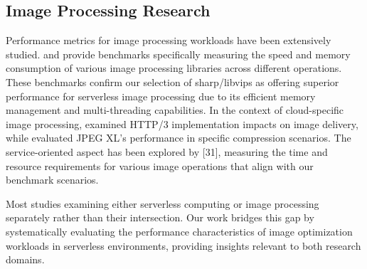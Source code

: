 \subsection{Image Processing Research}
\enlargethispage{10\baselineskip}

Performance metrics for image processing workloads have been extensively studied. \cite{fuller2024sharp} and \cite{cupitt2024libvips-speed} provide benchmarks specifically measuring the speed and memory consumption of various image processing libraries across different operations. These benchmarks confirm our selection of sharp/libvips as offering superior performance for serverless image processing due to its efficient memory management and multi-threading capabilities. In the context of cloud-specific image processing, \cite{bishop2022rfc-http3} examined HTTP/3 implementation impacts on image delivery, while \cite{sneyers2024jxl-modular} evaluated JPEG XL's performance in specific compression scenarios. The service-oriented aspect has been explored by [31], measuring the time and resource requirements for various image operations that align with our benchmark scenarios.

Most studies examining either serverless computing or image processing separately rather than their intersection. Our work bridges this gap by systematically evaluating the performance characteristics of image optimization workloads in serverless environments, providing insights relevant to both research domains.
